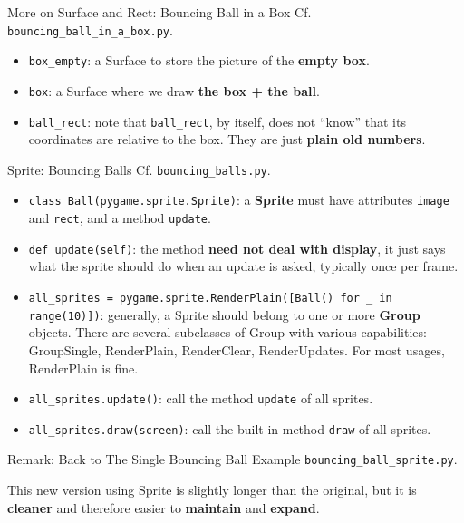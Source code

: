 \documentclass[aspectratio=169]{beamer}
\renewcommand{\emph}[1]{\textcolor{ClearTitle}{\bf #1}}
\begin{document}
\begin{frame}[fragile]{More on Surface and Rect: Bouncing Ball in a Box}
Cf.  \verb|bouncing_ball_in_a_box.py|.
\begin{itemize}
\item \verb|box_empty|: a Surface to store the picture of the \emph{empty box}.
\item \verb|box|: a Surface where we draw \emph{the box + the ball}.
\item \verb|ball_rect|: note that \verb|ball_rect|, by itself, does not ``know'' that its coordinates are relative to the box. They are just \emph{plain old numbers}.
\end{itemize}
\end{frame}

\begin{frame}[fragile]{Sprite: Bouncing Balls}
Cf.  \verb|bouncing_balls.py|.
\begin{itemize}
\item \verb|class Ball(pygame.sprite.Sprite)|: a \emph{Sprite} must have attributes \verb|image| and \verb|rect|, and a method \verb|update|.
\item \verb|def update(self)|: the method \emph{need not deal with display}, it just says what the sprite should do when an update is asked, typically once per frame. 
\item \verb|all_sprites = pygame.sprite.RenderPlain([Ball() for _ in| \verb|range(10)])|: generally, a Sprite should belong to one or more \emph{Group} objects. There are several subclasses of Group with various capabilities: GroupSingle, RenderPlain, RenderClear, RenderUpdates. For most usages, RenderPlain is fine.
\item \verb|all_sprites.update()|: call the method \verb|update| of all sprites.
\item \verb|all_sprites.draw(screen)|: call the built-in method \verb|draw| of all sprites.
\end{itemize}
\end{frame}

\begin{frame}[fragile]{Remark: Back to The Single Bouncing Ball Example}
\verb|bouncing_ball_sprite.py|.

This new version using Sprite is slightly longer than the original, but it is \emph{cleaner} and therefore easier to \emph{maintain} and \emph{expand}.
\end{frame}
\end{document}
